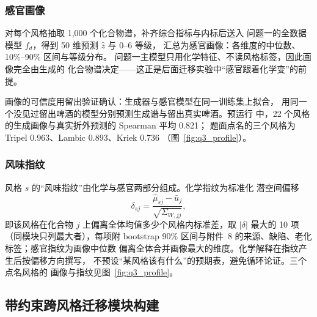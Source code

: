 \documentclass[12pt,a4paper]{article}
\begin{document}
\subsubsection{感官画像}

对每个风格抽取 1{,}000 个化合物谱，补齐综合指标与内标后送入
问题一的全数据模型 $f_d$，得到 50 维预测 $\hat z$ 与 0--6 等级，
汇总为感官画像：各维度的中位数、10\%--90\% 区间与等级分布。
问题一主模型只用化学特征、不读风格标签，因此画像完全由生成的
化合物谱决定——这正是后面迁移实验中``感官跟着化学变''的前提。

画像的可信度用留出验证确认：生成器与感官模型在同一训练集上拟合，
用同一个没见过留出啤酒的模型分别预测生成谱与留出真实啤酒。预运行
中，22 个风格的生成画像与真实折外预测的 Spearman 平均 0.821；
题面点名的三个风格为 Tripel 0.963、Lambic 0.893、Kriek 0.736
（图~\ref{fig:q3_profile}）。


\subsubsection{风味指纹}

风格 $s$ 的``风味指纹''由化学与感官两部分组成。化学指纹为标准化
潜空间偏移
\begin{equation}
  \delta_{sj}=\frac{\hat\mu_{sj}-\bar u_j}{\sqrt{\Sigma_{W,jj}}},
\end{equation}
即该风格在化合物 $j$ 上偏离全体均值多少个风格内标准差，取
$|\delta|$ 最大的 10 项（同模块只列最大者），每项附 bootstrap
90\% 区间与附件~8 的来源、缺陷、老化标签；感官指纹为画像中位数
偏离全体合并画像最大的维度。化学解释在指纹产生后按偏移方向撰写，
不预设``某风格该有什么''的预期表，避免循环论证。三个点名风格的
画像与指纹见图~\ref{fig:q3_profile}。


\subsection{带约束跨风格迁移模块构建}
\end{document}
